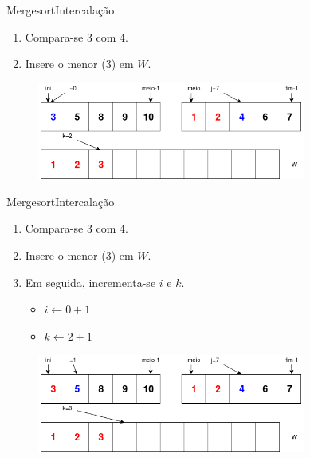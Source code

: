 \documentclass[aspectratio=169]{beamer}
\begin{document}
\begin{frame}{Mergesort}{Intercalação}
\begin{enumerate}
 \item Compara-se 3 com 4.
 \item Insere o menor (3) em $W$.   
\end{enumerate}

\begin{figure}[!h]
  \centering
  \includegraphics[width=250pt]{imgs/merge/merge3_1.png}
  \label{fig_merge3_1}
\end{figure}
\end{frame}


\begin{frame}{Mergesort}{Intercalação}
\begin{enumerate}
 \item Compara-se 3 com 4.
 \item Insere o menor (3) em $W$.
 \item Em seguida, incrementa-se $i$ e $k$.
 \begin{itemize}
 \item $i\leftarrow 0 + 1$
 \item $k\leftarrow 2 + 1$
 \end{itemize}   
\end{enumerate}

\begin{figure}[!h]
  \centering
  \includegraphics[width=250pt]{imgs/merge/merge4.png}
  \label{fig_merge3_2}
\end{figure}
\end{frame}


\end{document}
